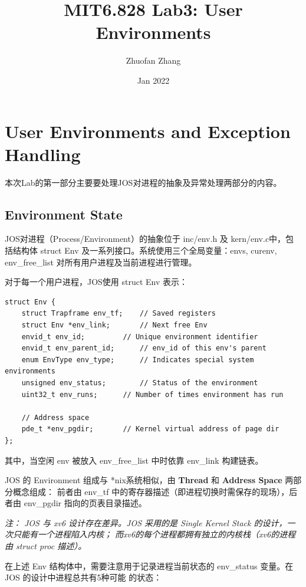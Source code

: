 \documentclass[12pt, letterpaper]{report}
\title{MIT6.828 Lab3: User Environments}
\author{Zhuofan Zhang}
\date{Jan 2022}
\begin{document}
\maketitle
\renewcommand\contentsname{\Huge Contents}
\tableofcontents{}


\newpage
{}
\chapter[\Large Physical Page Management]{User Environments and Exception Handling}
本次Lab的第一部分主要要处理JOS对进程的抽象及异常处理两部分的内容。

\section[\large Environment State]{Environment State}
JOS对进程（Process/Environment）的抽象位于 inc/env.h 及 kern/env.c中，包括结构体  
struct Env 及一系列接口。系统使用三个全局变量：envs, curenv, env\_free\_list 对所有用户进程及当前进程进行管理。\par
对于每一个用户进程，JOS使用 struct Env 表示：
\lstset{style=CStyle}
\setmainfont{Consolas}
\begin{lstlisting}
struct Env {
    struct Trapframe env_tf;	// Saved registers
    struct Env *env_link;		// Next free Env
    envid_t env_id;			// Unique environment identifier
    envid_t env_parent_id;		// env_id of this env's parent
    enum EnvType env_type;		// Indicates special system environments
    unsigned env_status;		// Status of the environment
    uint32_t env_runs;		// Number of times environment has run

    // Address space
    pde_t *env_pgdir;		// Kernel virtual address of page dir
};
\end{lstlisting}
\setmainfont{Times New Roman}
其中，当空闲 env 被放入 env\_free\_list 中时依靠 env\_link 构建链表。\par
JOS 的 Environment 组成与 *nix系统相似，由 {\bf Thread} 和 {\bf Address Space} 两部分概念组成：
前者由 env\_tf 中的寄存器描述（即进程切换时需保存的现场），后者由 env\_pgdir 指向的页表目录描述。\par
\textsl{注： JOS 与 xv6 设计存在差异。JOS 采用的是 Single Kernel Stack 的设计，一次只能有一个进程陷入内核；
而xv6的每个进程都拥有独立的内核栈（xv6的进程由 struct proc 描述）。}\par
\newpage
在上述 Env 结构体中，需要注意用于记录进程当前状态的 env\_status 变量。在 JOS 的设计中进程总共有5种可能
的状态：\par
\quad \par 
\end{document}
